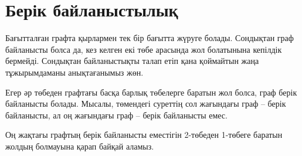 \chapter{Берік байланыстылық}


Бағытталған графта қырлармен тек бір бағытта жүруге болады.
Сондықтан граф байланысты болса да, кез келген екі төбе арасында
жол болатынына кепілдік бермейді. Сондықтан байланыстықты талап етіп қана қоймайтын жаңа тұжырымдаманы анықтағанымыз жөн.


Егер әр төбеден графтағы басқа барлық
төбелерге баратын жол болса, граф берік
байланысты болады. Мысалы, төмендегі суреттің сол жағындағы граф --
берік байланысты, ал оң жағындағы граф -- берік байланысты емес.

\begin{center}
\end{center}

Оң жақтағы графтың берік байланысты еместігін 2-төбеден
1-төбеге баратын жолдың болмауына қарап байқай аламыз.

